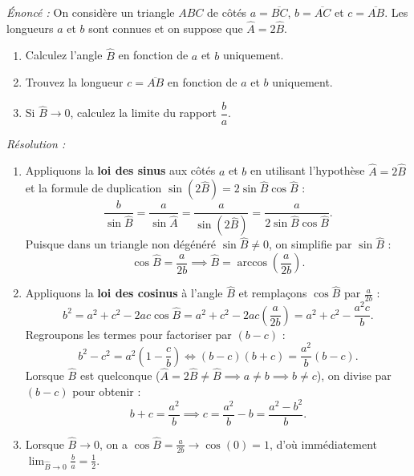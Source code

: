 \begin{exemple}[Problème 1 : Résolution d'un triangle avec $\widehat{A} = 2\widehat{B}$ (UCLouvain -- Septembre 2022, Question 2)]
\emph{Énoncé :} On considère un triangle $ABC$ de côtés $a = \overline{BC}$, $b = \overline{AC}$ et $c = \overline{AB}$. Les longueurs $a$ et $b$ sont connues et on suppose que $\widehat{A} = 2\widehat{B}$.
\begin{enumerate}
    \item Calculez l'angle $\widehat{B}$ en fonction de $a$ et $b$ uniquement.
    \item Trouvez la longueur $c = \overline{AB}$ en fonction de $a$ et $b$ uniquement.
    \item Si $\widehat{B} \to 0$, calculez la limite du rapport $\dfrac{b}{a}$.
\end{enumerate}
\emph{Résolution :}
\begin{enumerate}
    \item Appliquons la \textbf{loi des sinus} aux côtés $a$ et $b$ en utilisant l'hypothèse $\widehat{A} = 2\widehat{B}$ et la formule de duplication $\sin(2\widehat{B}) = 2\sin\widehat{B}\cos\widehat{B}$ :
    \[
        \frac{b}{\sin\widehat{B}} = \frac{a}{\sin\widehat{A}} = \frac{a}{\sin(2\widehat{B})} = \frac{a}{2\sin\widehat{B}\cos\widehat{B}}.
    \]
    Puisque dans un triangle non dégénéré $\sin\widehat{B} \neq 0$, on simplifie par $\sin\widehat{B}$ :
    \[
        \cos\widehat{B} = \frac{a}{2b} \implies \boxed{\widehat{B} = \arccos\left(\frac{a}{2b}\right)}.
    \]
    \item Appliquons la \textbf{loi des cosinus} à l'angle $\widehat{B}$ et remplaçons $\cos\widehat{B}$ par $\frac{a}{2b}$ :
    \[
        b^2 = a^2 + c^2 - 2ac\cos\widehat{B} = a^2 + c^2 - 2ac\left(\frac{a}{2b}\right) = a^2 + c^2 - \frac{a^2 c}{b}.
    \]
    Regroupons les termes pour factoriser par $(b - c)$ :
    \[
        b^2 - c^2 = a^2\left(1 - \frac{c}{b}\right) \iff (b - c)(b + c) = \frac{a^2}{b}(b - c).
    \]
    Lorsque $\widehat{B}$ est quelconque ($\widehat{A} = 2\widehat{B} \neq \widehat{B} \implies a \neq b \implies b \neq c$), on divise par $(b-c)$ pour obtenir :
    \[
        b + c = \frac{a^2}{b} \implies \boxed{c = \frac{a^2}{b} - b = \frac{a^2 - b^2}{b}}.
    \]
    \item Lorsque $\widehat{B} \to 0$, on a $\cos\widehat{B} = \frac{a}{2b} \to \cos(0) = 1$, d'où immédiatement $\boxed{\lim_{\widehat{B}\to 0} \frac{b}{a} = \frac{1}{2}}$.
\end{enumerate}
\end{exemple}

